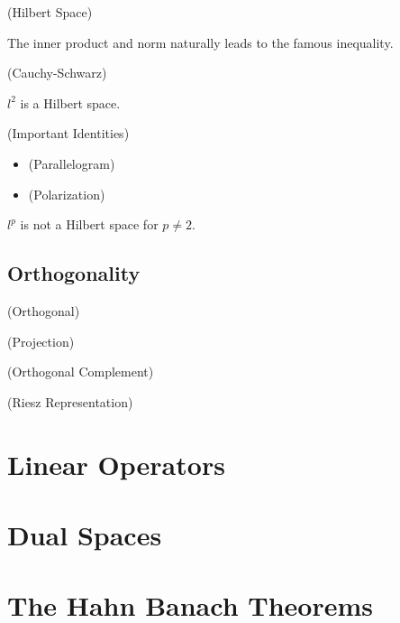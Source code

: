 \documentclass{article}
\begin{document}
\begin{defn}
    (Hilbert Space)
\end{defn}  

The inner product and norm naturally leads to the famous inequality.  

\begin{prop}
    (Cauchy-Schwarz)
\end{prop}

\begin{eg}
    $l^2$ is a Hilbert space.
\end{eg} 

\begin{prop}
    (Important Identities)
    \begin{itemize}
        \item (Parallelogram)
        \item (Polarization)
    \end{itemize}
\end{prop}  

\begin{prop}
    $l^p$ is not a Hilbert space for $p \neq 2$.
\end{prop}  

\subsection{Orthogonality}  

\begin{defn}
    (Orthogonal)
\end{defn}  

\begin{thm}
    (Projection)
\end{thm}  

\begin{thm}
    (Orthogonal Complement)
\end{thm}

\begin{thm}
    (Riesz Representation)
\end{thm}


\section{Linear Operators}  

\section{Dual Spaces}  

\section{The Hahn Banach Theorems}  
\end{document}
